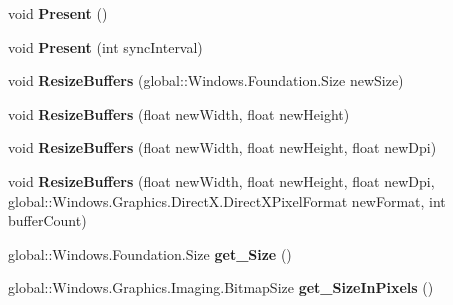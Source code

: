 \begin{DoxyCompactItemize}
void {\bfseries Present} ()
\item 
\mbox{\label{class_microsoft_1_1_graphics_1_1_canvas_1_1_canvas_swap_chain_a632d5d775ab2bee9fd02dfec7fb3f8fe}} 
void {\bfseries Present} (int sync\+Interval)
\item 
\mbox{\label{class_microsoft_1_1_graphics_1_1_canvas_1_1_canvas_swap_chain_a2087d6f0b3c5f784e46da6a8a01a7769}} 
void {\bfseries Resize\+Buffers} (global\+::\+Windows.\+Foundation.\+Size new\+Size)
\item 
\mbox{\label{class_microsoft_1_1_graphics_1_1_canvas_1_1_canvas_swap_chain_a07c22f67a80d734401af8925d117e6ab}} 
void {\bfseries Resize\+Buffers} (float new\+Width, float new\+Height)
\item 
\mbox{\label{class_microsoft_1_1_graphics_1_1_canvas_1_1_canvas_swap_chain_a1ec6bf6c6440d2fdab4c8fe92949cf5f}} 
void {\bfseries Resize\+Buffers} (float new\+Width, float new\+Height, float new\+Dpi)
\item 
\mbox{\label{class_microsoft_1_1_graphics_1_1_canvas_1_1_canvas_swap_chain_affc0b565c5922897f7887810f6b5612e}} 
void {\bfseries Resize\+Buffers} (float new\+Width, float new\+Height, float new\+Dpi, global\+::\+Windows.\+Graphics.\+Direct\+X.\+Direct\+X\+Pixel\+Format new\+Format, int buffer\+Count)
\item 
\mbox{\label{class_microsoft_1_1_graphics_1_1_canvas_1_1_canvas_swap_chain_aaa05b9d84953792e41ab6641a382672a}} 
global\+::\+Windows.\+Foundation.\+Size {\bfseries get\+\_\+\+Size} ()
\item 
\mbox{\label{class_microsoft_1_1_graphics_1_1_canvas_1_1_canvas_swap_chain_aab3e2abeaeb2f7f91fd7c354c4b47b00}} 
global\+::\+Windows.\+Graphics.\+Imaging.\+Bitmap\+Size {\bfseries get\+\_\+\+Size\+In\+Pixels} ()
\item 
\mbox{\label{class_microsoft_1_1_graphics_1_1_canvas_1_1_canvas_swap_chain_a264781926bb0da3371bb4c87999cbbb1}} 

\end{DoxyCompactItemize}
